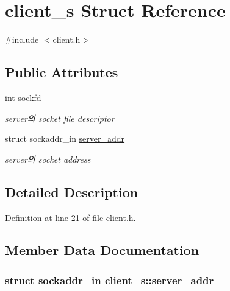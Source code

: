 \hypertarget{structclient__s}{\section{client\-\_\-s Struct Reference}
\label{structclient__s}
}


{\ttfamily \#include $<$client.\-h$>$}

\subsection*{Public Attributes}
\begin{DoxyCompactItemize}
\item 
int \hyperlink{structclient__s_a409a70b3071eaf5be18d0439d256756a}{sockfd}
\begin{DoxyCompactList}\small\item\em server의 socket file descriptor \end{DoxyCompactList}\item 
struct sockaddr\-\_\-in \hyperlink{structclient__s_a4cb8f28435762b205424d16ea39dcab3}{server\-\_\-addr}
\begin{DoxyCompactList}\small\item\em server의 socket address \end{DoxyCompactList}\end{DoxyCompactItemize}


\subsection{Detailed Description}


Definition at line 21 of file client.\-h.



\subsection{Member Data Documentation}
\hypertarget{structclient__s_a4cb8f28435762b205424d16ea39dcab3}{
\subsubsection[{server\-\_\-addr}]{\setlength{\rightskip}{0pt plus 5cm}struct sockaddr\-\_\-in client\-\_\-s\-::server\-\_\-addr}}\label{structclient__s_a4cb8f28435762b205424d16ea39dcab3}


